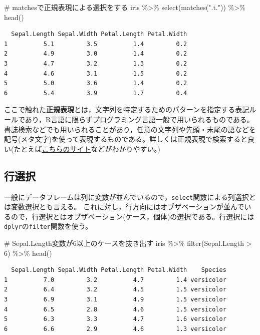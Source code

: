 \documentclass[
  a4paper,
]{ltjsbook}
\newenvironment{Shaded}{\begin{snugshade}}{\end{snugshade}}
\newcommand{\CommentTok}[1]{\textcolor[rgb]{0.37,0.37,0.37}{#1}}
\newcommand{\DecValTok}[1]{\textcolor[rgb]{0.68,0.00,0.00}{#1}}
\newcommand{\FunctionTok}[1]{\textcolor[rgb]{0.28,0.35,0.67}{#1}}
\newcommand{\NormalTok}[1]{\textcolor[rgb]{0.00,0.23,0.31}{#1}}
\newcommand{\SpecialCharTok}[1]{\textcolor[rgb]{0.37,0.37,0.37}{#1}}
\newcommand{\StringTok}[1]{\textcolor[rgb]{0.13,0.47,0.30}{#1}}
\begin{document}
\begin{Shaded}
\begin{Highlighting}[]
\CommentTok{\# matchesで正規表現による選択をする}
\NormalTok{iris }\SpecialCharTok{\%\textgreater{}\%} \FunctionTok{select}\NormalTok{(}\FunctionTok{matches}\NormalTok{(}\StringTok{".t."}\NormalTok{)) }\SpecialCharTok{\%\textgreater{}\%} \FunctionTok{head}\NormalTok{()}
\end{Highlighting}
\end{Shaded}

\begin{verbatim}
  Sepal.Length Sepal.Width Petal.Length Petal.Width
1          5.1         3.5          1.4         0.2
2          4.9         3.0          1.4         0.2
3          4.7         3.2          1.3         0.2
4          4.6         3.1          1.5         0.2
5          5.0         3.6          1.4         0.2
6          5.4         3.9          1.7         0.4
\end{verbatim}

ここで触れた\textbf{正規表現}とは，文字列を特定するためのパターンを指定する表記ルールであり，R言語に限らずプログラミング言語一般で用いられるものである。書誌検索などでも用いられることがあり，任意の文字列や先頭・末尾の語などを記号(メタ文字)を使って表現するものである。詳しくは正規表現で検索すると良い(たとえば\href{https://userweb.mnet.ne.jp/nakama/}{こちらのサイト}などがわかりやすい。)

\subsection{行選択}\label{ux884cux9078ux629e}

一般にデータフレームは列に変数が並んでいるので，\texttt{select}関数による列選択とは変数選択とも言える。
これに対し，行方向にはオブザベーションが並んでいるので，行選択とはオブザベーション(ケース，個体)の選択である。行選択には\texttt{dplyr}の\texttt{filter}関数を使う。

\begin{Shaded}
\begin{Highlighting}[]
\CommentTok{\# Sepal.Length変数が6以上のケースを抜き出す}
\NormalTok{iris }\SpecialCharTok{\%\textgreater{}\%} \FunctionTok{filter}\NormalTok{(Sepal.Length }\SpecialCharTok{\textgreater{}} \DecValTok{6}\NormalTok{) }\SpecialCharTok{\%\textgreater{}\%} \FunctionTok{head}\NormalTok{()}
\end{Highlighting}
\end{Shaded}

\begin{verbatim}
  Sepal.Length Sepal.Width Petal.Length Petal.Width    Species
1          7.0         3.2          4.7         1.4 versicolor
2          6.4         3.2          4.5         1.5 versicolor
3          6.9         3.1          4.9         1.5 versicolor
4          6.5         2.8          4.6         1.5 versicolor
5          6.3         3.3          4.7         1.6 versicolor
6          6.6         2.9          4.6         1.3 versicolor
\end{verbatim}
\end{document}

